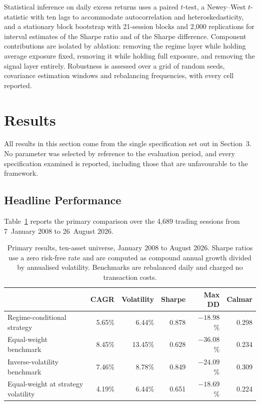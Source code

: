 \documentclass{singlecol-new}
\theoremstyle{TH}{
\newtheorem{lemma}{Lemma}
\newtheorem{theorem}[lemma]{Theorem}
\newtheorem{corrolary}[lemma]{Corrolary}
\newtheorem{conjecture}[lemma]{Conjecture}
\newtheorem{proposition}[lemma]{Proposition}
\newtheorem{claim}[lemma]{Claim}
\newtheorem{stheorem}[lemma]{Wrong Theorem}
\newtheorem{algorithm}{Algorithm}
}
\theoremstyle{THrm}{
\newtheorem{definition}{Definition}[section]
\newtheorem{question}{Question}[section]
\newtheorem{remark}{Remark}
\newtheorem{scheme}{Scheme}
}
\theoremstyle{THhit}{
\newtheorem{case}{Case}[section]
}
\begin{document}
Statistical inference on daily excess returns uses a paired $t$-test, a Newey--West
$t$-statistic with ten lags to accommodate autocorrelation and heteroskedasticity, and
a stationary block bootstrap with 21-session blocks and 2{,}000 replications for
interval estimates of the Sharpe ratio and of the Sharpe difference. Component
contributions are isolated by ablation: removing the regime layer while holding average
exposure fixed, removing it while holding full exposure, and removing the signal layer
entirely. Robustness is assessed over a grid of random seeds, covariance estimation
windows and rebalancing frequencies, with every cell reported.

\section{Results}
\label{sec:results}

All results in this section come from the single specification set out in Section~3.
No parameter was selected by reference to the evaluation period, and every
specification examined is reported, including those that are unfavourable to the
framework.

\subsection{Headline Performance}

Table~\ref{tab:main} reports the primary comparison over the 4{,}689 trading sessions from
7~January 2008 to 26~August 2026.

\begin{table}[!ht]
\centering
\caption{Primary results, ten-asset universe, January 2008 to August 2026. Sharpe
ratios use a zero risk-free rate and are computed as compound annual growth divided by
annualised volatility. Benchmarks are rebalanced daily and charged no transaction costs.}
\label{tab:main}
\small
\begin{tabular}{p{4.4cm}rrrrr}
\hline
& \textbf{CAGR} & \textbf{Volatility} & \textbf{Sharpe} & \textbf{Max DD} & \textbf{Calmar} \\
\hline
Regime-conditional strategy & 5.65\% & 6.44\% & 0.878 & $-18.98$\% & 0.298 \\
Equal-weight benchmark & 8.45\% & 13.45\% & 0.628 & $-36.08$\% & 0.234 \\
Inverse-volatility benchmark & 7.46\% & 8.78\% & 0.849 & $-24.09$\% & 0.309 \\
Equal-weight at strategy volatility & 4.19\% & 6.44\% & 0.651 & $-18.69$\% & 0.224 \\
\hline
\end{tabular}
\end{table}
\end{document}
